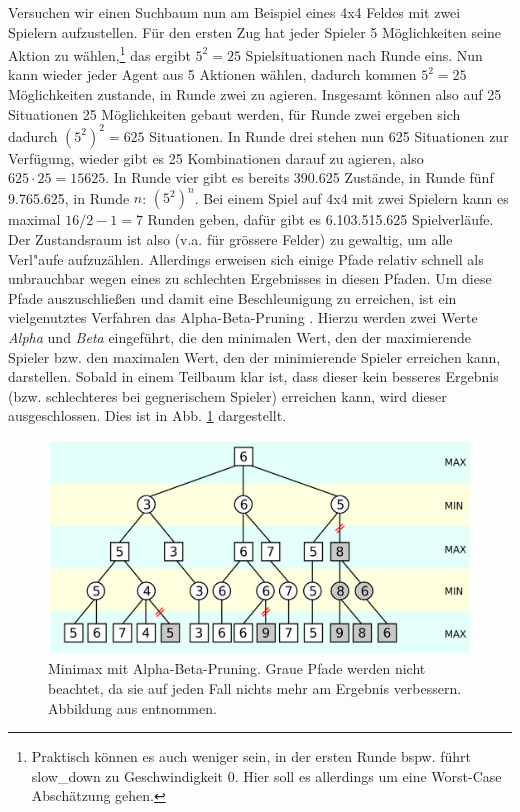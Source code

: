 Versuchen wir einen Suchbaum nun am Beispiel eines 4x4 Feldes mit zwei Spielern aufzustellen. Für den ersten Zug hat jeder Spieler 5 M\"oglichkeiten seine Aktion zu w\"ahlen,\footnote{Praktisch  können es auch weniger sein, in der ersten Runde bspw. f\"uhrt slow\_down zu Geschwindigkeit 0. Hier soll es allerdings um eine Worst-Case Absch\"atzung gehen.} das ergibt $5^{2} = 25$ Spielsituationen nach Runde eins. Nun kann wieder jeder Agent aus 5 Aktionen w\"ahlen, dadurch kommen  $5^{2} = 25$ M\"oglichkeiten zustande, in Runde zwei zu agieren. Insgesamt k\"onnen also auf 25 Situationen 25 M\"oglichkeiten gebaut werden, f\"ur Runde zwei ergeben sich dadurch $(5^{2})^{2} = 625$ Situationen. In Runde drei stehen nun 625 Situationen zur Verf\"ugung, wieder gibt es 25 Kombinationen darauf zu agieren, also $625 \cdot 25 = 15625$. In Runde vier gibt es bereits 390.625 Zust\"ande, in Runde f\"unf 9.765.625, in Runde $n$: $(5^{2})^{n}$. Bei einem Spiel auf 4x4 mit zwei Spielern kann es maximal $16 / 2 - 1 = 7$ Runden geben, daf\"ur gibt es 6.103.515.625 Spielverl\"aufe. Der Zustandsraum ist also (v.a. f\"ur gr\"ossere Felder) zu gewaltig, um alle Verl"aufe aufzuz\"ahlen. Allerdings erweisen sich einige Pfade relativ schnell als unbrauchbar wegen eines zu schlechten Ergebnisses in diesen Pfaden. Um diese Pfade auszuschließen und damit eine Beschleunigung zu erreichen, ist ein vielgenutztes Verfahren das Alpha-Beta-Pruning \cite{Knuth.1975}. Hierzu werden zwei Werte \textit{Alpha} und \textit{Beta} eingeführt, die den minimalen Wert, den der maximierende Spieler bzw. den maximalen Wert, den der minimierende Spieler erreichen kann, darstellen. Sobald in einem Teilbaum klar ist, dass dieser kein besseres Ergebnis (bzw. schlechteres bei gegnerischem Spieler) erreichen kann, wird dieser ausgeschlossen. Dies ist in Abb. \ref{fig:alphabeta} dargestellt.


\begin{figure}[h]
    \centering
    \includegraphics[width=\textwidth]{img/AB_pruning.svg.png}
    \caption[Minimax mit Alpha-Beta-Pruning]{Minimax mit Alpha-Beta-Pruning. Graue Pfade werden nicht beachtet, da sie auf jeden Fall nichts mehr am Ergebnis verbessern. Abbildung aus \cite{wikipedia_alpha_beta} entnommen.}
    \label{fig:alphabeta}
\end{figure}

